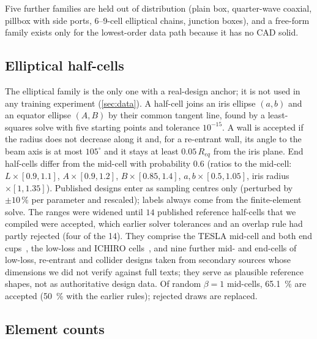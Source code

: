 Five further families are held out of distribution (plain box, quarter-wave coaxial, pillbox with side ports, 6--9-cell elliptical chains, junction boxes), and a free-form family exists only for the lowest-order data path because it has no CAD solid.

\subsection{Elliptical half-cells}\label{sec:A05-halfcell}

The elliptical family is the only one with a real-design anchor; it is not used in any training experiment (\cref{sec:data}).
A half-cell joins an iris ellipse $(a,b)$ and an equator ellipse $(A,B)$ by their common tangent line, found by a least-squares solve with five starting points and tolerance $10^{-15}$.
A wall is accepted if the radius does not decrease along it and, for a re-entrant wall, its angle to the beam axis is at most $105^\circ$ and it stays at least $0.05\,R_{eq}$ from the iris plane.
End half-cells differ from the mid-cell with probability $0.6$ (ratios to the mid-cell: $L\times[0.9,1.1]$, $A\times[0.9,1.2]$, $B\times[0.85,1.4]$, $a,b\times[0.5,1.05]$, iris radius $\times[1,1.35]$).
Published designs enter as sampling centres only (perturbed by $\pm10\,\%$ per parameter and rescaled); labels always come from the finite-element solve.
The ranges were widened until $14$ published reference half-cells that we compiled were accepted, which earlier solver tolerances and an overlap rule had partly rejected (four of the 14).
They comprise the TESLA mid-cell and both end cups~\cite{aune2000superconducting}, the low-loss and ICHIRO cells~\cite{juntong2009highgradient}, and nine further mid- and end-cells of low-loss, re-entrant and collider designs taken from secondary sources whose dimensions we did not verify against full texts; they serve as plausible reference shapes, not as authoritative design data.
Of random $\beta=1$ mid-cells, \SI{65.1}{\percent} are accepted (\SI{50}{\percent} with the earlier rules); rejected draws are replaced.

\subsection{Element counts}\label{sec:A05-counts}

